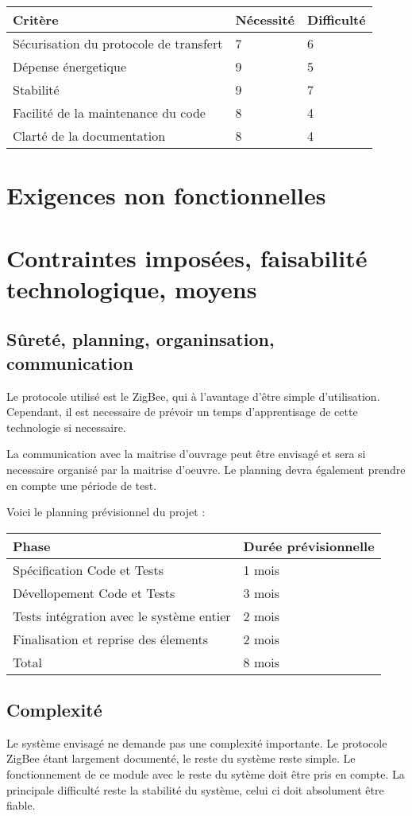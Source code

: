 \begin{tabular}{|l|l|l|}
  \hline
  Critère & Nécessité & Difficulté \\
  \hline
  Sécurisation du protocole de transfert & 7 & 6 \\
  Dépense énergetique & 9 & 5 \\
  Stabilité & 9 & 7 \\
  Facilité de la maintenance du code & 8 & 4 \\
  Clarté de la documentation  & 8 & 4 \\
  \hline
\end{tabular}

\section{Exigences non fonctionnelles}

\section{Contraintes imposées, faisabilité technologique, moyens}
\subsection{Sûreté, planning, organinsation, communication}
Le protocole utilisé est le ZigBee, qui à l'avantage d'être simple d'utilisation. Cependant, il est necessaire de prévoir un temps d'apprentisage de cette technologie si necessaire. 

La communication avec la maitrise d'ouvrage peut être envisagé et sera si necessaire organisé par la maitrise d'oeuvre. Le planning devra également prendre en compte une période de test.

Voici le planning prévisionnel du projet :

\begin{tabular}{|l|l|}
  \hline
  Phase & Durée prévisionnelle \\
  \hline
  Spécification Code et Tests & 1 mois \\
  Dévellopement Code et Tests & 3 mois \\
  Tests intégration avec le système entier & 2 mois \\
  Finalisation et reprise des élements  & 2 mois \\
  \hline
  Total  & 8 mois \\
  \hline
\end{tabular}

\subsection{Complexité}
Le système envisagé ne demande pas une complexité importante. Le protocole ZigBee étant largement documenté, le reste du système reste simple. Le fonctionnement de ce module avec le reste du sytème doit être pris en compte. 
La principale difficulté reste la stabilité du système, celui ci doit absolument être fiable. 

